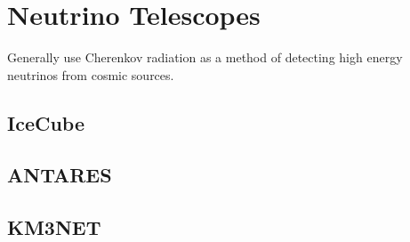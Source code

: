 \section{Neutrino Telescopes}

Generally use Cherenkov radiation as a method of detecting high energy neutrinos from cosmic sources.

\subsection{IceCube}

\subsection{ANTARES}

\subsection{KM3NET}
